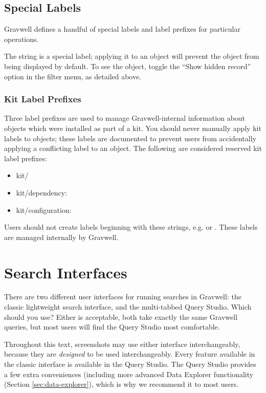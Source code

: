 \clearpage

\subsection{Special Labels}

Gravwell defines a handful of special labels and label prefixes for particular operations.

The string  is a special label; applying it to an object will prevent the object from being displayed by default. To see the object, toggle the ``Show hidden record'' option in the filter menu, as detailed above.

\subsubsection{Kit Label Prefixes}
Three label prefixes are used to manage Gravwell-internal information about objects which were installed as part of a kit. You should never manually apply kit labels to objects; these labels are documented to prevent users from accidentally applying a conflicting label to an object. The following are considered reserved kit label prefixes:


\begin{itemize}
\tightlist
\item kit/
\item kit/dependency:
\item kit/configuration:
\end{itemize}

Users should not create labels beginning with these strings, e.g.  or . These labels are managed internally by Gravwell.

\clearpage
\section{Search Interfaces}
There are two different user interfaces for running searches in Gravwell: the classic lightweight search interface, and the multi-tabbed Query Studio. Which should you use? Either is acceptable, both take exactly the same Gravwell queries, but most users will find the Query Studio most comfortable.

Throughout this text, screenshots may use either interface interchangeably, because they are \emph{designed} to be used interchangeably. Every feature available in the classic interface is available in the Query Studio. The Query Studio provides a few extra conveniences (including more advanced Data Explorer functionality (Section \ref{sec:data-explorer}), which is why we recommend it to most users.

